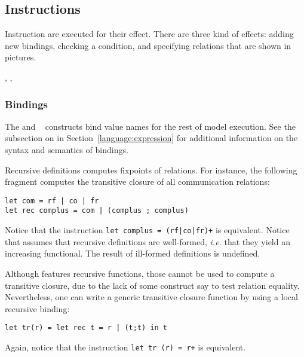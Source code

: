 \subsection{\label{language:instruction}Instructions}
Instruction are executed for their  effect.
There are three kind of effects: adding new bindings,
checking a condition, and specifying relations that are shown in pictures.
\begin{syntax}
 \is{}   \boption{}  \eoption {} \brepet{}   \erepet{}
\alt \boption {} \eoption {}  \boption {} \eoption
\alt {}  \T{=} \boption \T{||} 
\brepet \T{||}  \erepet
\alt {}   \T{=} \brepet {} \erepet {}
\alt {}    \boption {} \eoption
\alt {}   
\alt {}  \brepet \T{,}  \erepet
\alt {}  \brepet \T{,}  \erepet
\alt {}     \brepet{}  \erepet {}
\alt {}   
\alt {} 
\sep
{} \is {} \orelse \T{\textasciitilde} 
\sep
{} \is {} \orelse {} \orelse {}
\end{syntax}

\subsubsection*{Bindings}
The  and ~ constructs bind value names for the rest
of model execution.
See the subsection on 
in Section~\ref{language:expression}
for additional information on the syntax and semantics of bindings.


Recursive definitions computes fixpoints of relations.
For instance, the following fragment computes the transitive closure of
all communication relations:
\begin{verbatim}
let com = rf | co | fr
let rec complus = com | (complus ; complus)
\end{verbatim}
Notice that the instruction \verb-let complus = (rf|co|fr)+- is equivalent.
Notice that \herd{} assumes that recursive definitions are well-formed,
\emph{i.e.} that they yield an increasing functional.
The result of ill-formed definitions is undefined.

Although \herd{} features recursive functions, those cannot be used
to compute a transitive closure, due to the lack of some construct
say to test relation equality. Nevertheless, one can
write a generic transitive closure
function by using a local recursive binding:
\begin{verbatim}
let tr(r) = let rec t = r | (t;t) in t
\end{verbatim}
Again, notice that the instruction \verb-let tr (r) = r+- is equivalent.

